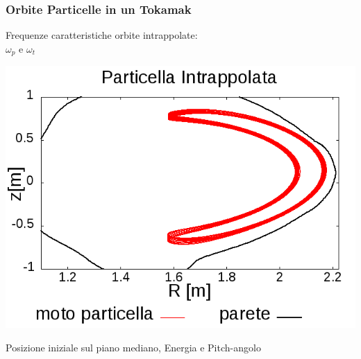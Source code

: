 \begin{frame}
\frametitle{Orbite Particelle in un Tokamak}
\begin{center}
Frequenze caratteristiche orbite intrappolate:\\ $\omega_p$ e $\omega_t$
\end{center}
\begin{center}
\includegraphics[scale=0.35]{Immagini/Simulazioni/Single/590/2145_E_40k.png}
\end{center}
\begin{center}
Posizione iniziale sul piano mediano, Energia e Pitch-angolo
\end{center}

\end{frame}


